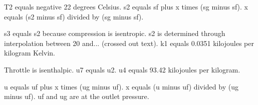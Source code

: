 T2 equals negative 22 degrees Celsius.  
s2 equals sf plus x times (sg minus sf).  
x equals (s2 minus sf) divided by (sg minus sf).  

s3 equals s2 because compression is isentropic.  
s2 is determined through interpolation between 20 and... (crossed out text).  
k1 equals 0.0351 kilojoules per kilogram Kelvin.  

Throttle is isenthalpic.  
u7 equals u2.  
u4 equals 93.42 kilojoules per kilogram.  

u equals uf plus x times (ug minus uf).  
x equals (u minus uf) divided by (ug minus uf).  
uf and ug are at the outlet pressure.